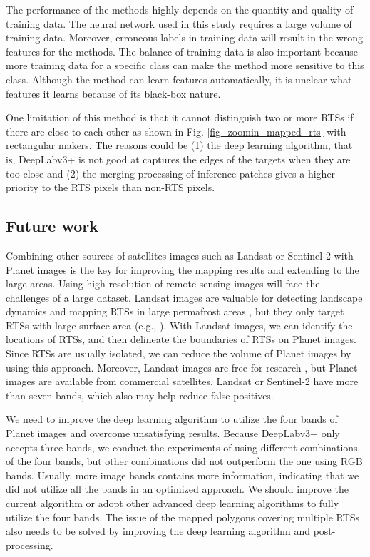 \documentclass[preprint,12pt,authoryear]{elsarticle}
\begin{document}
The performance of the methods highly depends on the quantity and quality of training data. The neural network used in this study requires a large volume of training data. Moreover, erroneous labels in training data will result in the wrong features for the methods. The balance of training data is also important because more training data for a specific class can make the method more sensitive to this class. Although the method can learn features automatically, it is unclear what features it learns because of its black-box nature. 

One limitation of this method is that it cannot distinguish two or more RTSs if there are close to each other as shown in Fig. \ref{fig_zoomin_mapped_rts} with rectangular makers. The reasons could be (1) the deep learning algorithm, that is, DeepLabv3+ is not good at captures the edges of the targets when they are too close and (2) the merging processing of inference patches gives a higher priority to the RTS pixels than non-RTS pixels.

\subsection{Future work}
\label{subsec_future}

Combining other sources of satellites images such as Landsat or Sentinel-2 with Planet images is the key for improving the mapping results and extending to the large areas. Using high-resolution of remote sensing images will face the challenges of a large dataset. Landsat images are valuable for detecting landscape dynamics and mapping RTSs in large permafrost areas \citep{nitze_detection_2016, nitze_landsat-based_2017, nitze2018remote}, but they 
only target RTSs with large surface area (e.g., \citealp{brooker2014investigating}). With Landsat images, we can identify the locations of RTSs, and then delineate the boundaries of RTSs on Planet images. Since RTSs are usually isolated, we can reduce the volume of Planet images by using this approach. Moreover, Landsat images are free for research \citep{zhu2019benefits}, but Planet images are available from commercial satellites. Landsat or Sentinel-2 have more than seven bands, which also may help reduce false positives. 

We need to improve the deep learning algorithm to utilize the four bands of Planet images and overcome unsatisfying results. Because DeepLabv3+ only accepts three bands, we conduct the experiments of using different combinations of the four bands, but other combinations did not outperform the one using RGB bands. Usually, more image bands contains more information, indicating that we did not utilize all the bands in an optimized approach. We should improve the current algorithm or adopt other advanced deep learning algorithms to fully utilize the four bands.
The issue of the mapped polygons covering multiple RTSs also needs to be solved by improving the deep learning algorithm and post-processing. 
\end{document}
